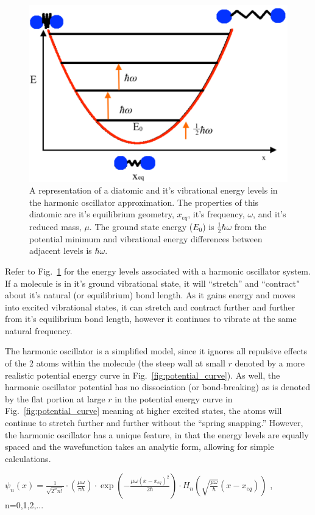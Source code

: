 \documentclass[12pt]{article}
\begin{document}
\begin{figure}
    \begin{center}
        \includegraphics[width=0.4\linewidth]{figures/Harmonic_Oscillator.pdf}
    \end{center}
    \caption{
    A representation of a diatomic and it's vibrational energy levels in the harmonic oscillator approximation. The properties of this diatomic are it's equilibrium geometry, $x_{eq}$, it's frequency, $\omega$, and it's reduced mass, $\mu$. The ground state energy ($E_0$) is $\frac{1}{2}\hbar\omega$ from the potential minimum and vibrational energy differences between adjacent levels is $\hbar\omega$.
    }
    \label{fig:harmonic_curve}
\end{figure}

Refer to Fig.~\ref{fig:harmonic_curve} for the energy levels associated with a harmonic oscillator system. If a molecule is in it's ground vibrational state, it will ``stretch'' and ``contract" about it’s natural (or equilibrium) bond length. As it gains energy and moves into excited vibrational states, it can stretch and contract further and further from it’s equilibrium bond length, however it continues to vibrate at the same natural frequency.

The harmonic oscillator is a simplified model, since it ignores all repulsive effects of the 2 atoms within the molecule (the steep wall at small $r$ denoted by a more realistic potential energy curve in Fig.~\ref{fig:potential_curve}). As well, the harmonic oscillator potential has no dissociation (or bond-breaking) as is denoted by the flat portion at large $r$ in the potential energy curve in Fig.~\ref{fig:potential_curve} meaning at higher excited states, the atoms will continue to stretch further and further without the ``spring snapping.''
\newpage
However, the harmonic oscillator has a unique feature, in that the energy levels are equally spaced and the wavefunction takes an analytic form, allowing for simple calculations.

$\psi_n(x) = \frac{1}{\sqrt{2^nn!}}\cdot\left(\frac{\mu\omega}{\pi\hbar}\right)\cdot\exp\left(-\frac{\mu\omega (x-x_{eq})^2}{2\hbar}\right)\cdot H_n\left(\sqrt{\frac{\mu\omega}{\hbar}}(x-x_{eq})\right)$ , n=0,1,2,...
\end{document}
